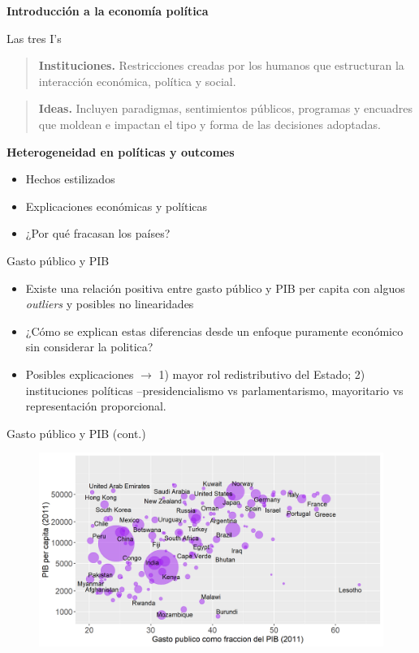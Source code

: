 \documentclass[
  ignorenonframetext,
]{beamer}
\providecommand{\tightlist}{%
  \setlength{\itemsep}{0pt}\setlength{\parskip}{0pt}}\usepackage{longtable,booktabs,array}
\begin{document}
\begin{frame}{\textbf{Introducción a la economía política}}
\begin{block}{Las tres I's}
\begin{quote}
\textbf{Instituciones.} Restricciones creadas por los humanos que
estructuran la interacción económica, política y social.
\end{quote}

\begin{quote}
\textbf{Ideas.} Incluyen paradigmas, sentimientos públicos, programas y
encuadres que moldean e impactan el tipo y forma de las decisiones
adoptadas.
\end{quote}
\end{block}
\end{frame}

\begin{frame}{\textbf{Heterogeneidad en políticas y outcomes}}
\protect\hypertarget{heterogeneidad-en-poluxedticas-y-outcomes}{}
\begin{itemize}
\tightlist
\item
  Hechos estilizados
\item
  Explicaciones económicas y políticas
\item
  ¿Por qué fracasan los países?
\end{itemize}

\begin{block}{Gasto público y PIB}
\protect\hypertarget{gasto-puxfablico-y-pib}{}
\begin{itemize}
\tightlist
\item
  Existe una relación positiva entre gasto público y PIB per capita con
  alguos \emph{outliers} y posibles no linearidades
\item
  ¿Cómo se explican estas diferencias desde un enfoque puramente
  económico sin considerar la politica?
\item
  Posibles explicaciones \(\longrightarrow\) 1) mayor rol redistributivo
  del Estado; 2) instituciones políticas --presidencialismo vs
  parlamentarismo, mayoritario vs representación proporcional.
\end{itemize}
\end{block}

\begin{block}{Gasto público y PIB (cont.)}
\protect\hypertarget{gasto-puxfablico-y-pib-cont.}{}
\begin{figure}

{\centering \includegraphics{fig/fig-01-001.png}

}
\end{figure}
\end{block}
\end{frame}
\end{document}
